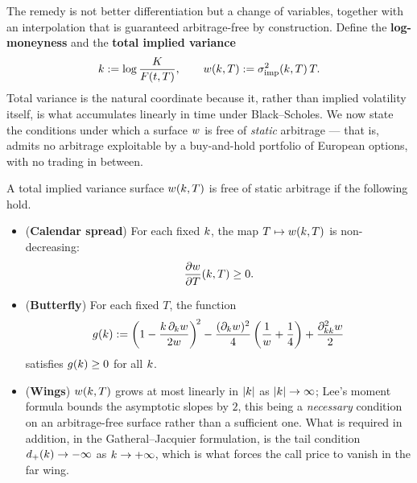 The remedy is not better differentiation but a change of variables, together with an interpolation 
that is guaranteed arbitrage-free by construction. Define the \textbf{log-moneyness} and the 
\textbf{total implied variance}
\begin{equation}\label{eq:totalvariance}
k := \log\frac{K}{F(t,T)}, \qquad w(k,T) := \sigma_{\mathrm{imp}}^2(k,T)\,T .
\end{equation}
Total variance is the natural coordinate because it, rather than implied volatility itself, is what 
accumulates linearly in time under Black--Scholes. We now state the conditions under which a surface 
$w$ is free of \emph{static} arbitrage --- that is, admits no arbitrage exploitable by a 
buy-and-hold portfolio of European options, with no trading in between.

\begin{proposition}\label{prop:staticarbitrage}
A total implied variance surface $w(k,T)$ is free of static arbitrage if the following hold.
\begin{itemize}
    \item[i)] (\textbf{Calendar spread}) For each fixed $k$, the map $T \mapsto w(k,T)$ 
    is non-decreasing:
    \begin{equation}\label{eq:calendarspread}
    \frac{\partial w}{\partial T}(k,T) \geq 0 .
    \end{equation}
    \item[ii)] (\textbf{Butterfly}) For each fixed $T$, the function
    \begin{equation}\label{eq:butterfly}
    g(k) := \left(1 - \frac{k\,\partial_k w}{2w}\right)^{\!2} 
    - \frac{(\partial_k w)^2}{4}\left(\frac{1}{w} + \frac{1}{4}\right) 
    + \frac{\partial^2_{kk} w}{2}
    \end{equation}
    satisfies $g(k) \geq 0$ for all $k$.
    \item[iii)] (\textbf{Wings}) $w(k,T)$ grows at most linearly in $|k|$ as 
    $|k|\to\infty$; Lee's moment formula \cite{lee2004} bounds the asymptotic slopes by $2$, this
    being a \emph{necessary} condition on an arbitrage-free surface rather than a sufficient one. What
    is required in addition, in the Gatheral--Jacquier formulation, is the tail condition
    $d_{+}(k)\to-\infty$ as $k\to+\infty$, which is what forces the call price to vanish in the
    far wing. \qedopentext

\end{itemize}
\end{proposition}

